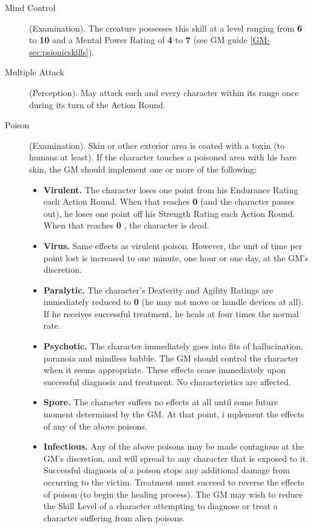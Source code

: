 \begin{description}
\item[Mind Control] (Examination). The creature possesses this skill
  at a level ranging from \textbf{6} to \textbf{10} and a Mental Power
  Rating of \textbf{4} to \textbf{7} (see GM guide
  \ref{GM-sec:psionicskills}).

\item[Multiple Attack] (Perception). May attack each and every
  character within its range once during its turn of the Action Round.

\item[Poison] (Examination). Skin or other exterior area is coated
  with a toxin (to humans at least). If the character touches a poisoned
  area with his bare skin, the GM should implement one or more of the
  following:

  \begin{itemize}
  \item \textbf{Virulent.} The character loses one point from his
    Endurance Rating each Action Round. When that reaches \textbf{0} (and the
    character passes out), he loses one point off his Strength Rating
    each Action Round. When that reaches \textbf{0} , the character is dead.
  \item \textbf{Virus.} Same effects as virulent poison. However, the
    unit of time per point lost is increased to one minute, one hour or
    one day, at the GM's discretion.
  \item \textbf{Paralytic.} The character's Dexterity and Agility
    Ratings are immediately reduced to \textbf{0} (he may not move or handle
    devices at all). If he receives successful treatment, he heals at
    four times the normal rate.
  \item \textbf{Psychotic.} The character immediately goes into fits of
    hallucination, paranoia and mindless babble. The GM should control
    the character when it seems appropriate. These effects cease
    immediately upon successful diagnosis and treatment. No
    characteristics are affected.
  \item \textbf{Spore.} The character suffers no effects at all until
    some future moment determined by the GM. At that point, i mplement
    the effects of any of the above poisons.
  \item \textbf{Infectious.} Any of the above poisons may be made
    contagious at the GM's discretion, and will spread to any character
    that is exposed to it.  Successful diagnosis of a poison stops any
    additional damage from occurring to the victim. Treatment must
    succeed to reverse the effects of poison (to begin the healing
    process). The GM may wish to reduce the Skill Level of a character
    attempting to diagnose or treat a character suffering from alien
    poisons.
  \end{itemize}


\end{description}
